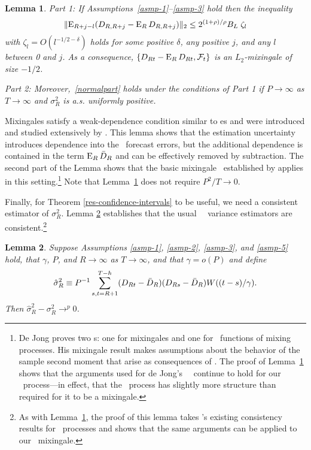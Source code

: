 \documentclass[11pt]{article}
\newtheorem{lem}{Lemma}
\newcommand{\citepos}[1]{\citeauthor{#1}'s \citeyearpar{#1}}
\begin{document}
\begin{lem}\label{res-mixingale}
  Part 1: If Assumptions~\ref{asmp-1}--\ref{asmp-3} hold then the
  inequality
  \begin{equation}\label{mixingaleR}
    \lVert \operatorname{E}_{R+j-l}(D_{R,R+j} - \operatorname{E}_R D_{R,R+j}) \rVert_2 \leq
    2^{(1+\rho)/\rho} B_L \;
    \zeta_l
  \end{equation}
  with $\zeta_l = O(l^{-1/2 - \delta})$ holds for some positive
  $\delta$, any positive $j$, and any $l$ between 0 and $j$.  As a
  consequence, $\{D_{Rt} - \operatorname{E}_R D_{Rt}, \mathcal F_t\}$ is an
  $L_2$-mixingale of size $-1/2$.  

  \noindent Part 2: Moreover,~\eqref{normalpart} holds under the
  conditions of Part 1 if $P \to \infty$ as $T \to \infty$ and
  $\sigma_R^2$ is a.s. uniformly positive.
\end{lem}

Mixingales satisfy a weak-dependence condition similar to \mds es and
were introduced and studied extensively by
\citet{Mcl:74,Mcl:75,Mcl:75b,Mcl:77}.  This lemma shows that the
estimation uncertainty introduces dependence into the \oos\ forecast
errors, but the additional dependence is contained in the term $\operatorname{E}_R
\bar{D}_{R}$ and can be effectively removed by subtraction.  The second part
of the Lemma shows that the basic mixingale \clt\ established by
\citet{Jon:97} applies in this setting.\footnote{De Jong proves two
  \clt s: one for mixingales and one for \ned\ functions of mixing
  processes.  His mixingale result makes assumptions about the
  behavior of the sample second moment that arise as consequences of
  \ned.  The proof of Lemma~\ref{res-mixingale} shows that the
  arguments used for de Jong's \ned\ \clt\ continue to hold for our
  \oos\ process---in effect, that the \oos\ process has slightly more
  structure than required for it to be a mixingale.}  Note that
Lemma~\ref{res-mixingale} does not require $P^2/T \to 0$.

Finally, for Theorem \ref{res-confidence-intervals} to be useful, we
need a consistent estimator of $\sigma_R^2$. Lemma
\ref{res-variance-estimator} establishes that the usual \oos\ \hac\
variance estimators are consistent.\footnote{As with
      Lemma~\ref{res-mixingale}, the proof of this lemma takes
      \citepos{JoD:00} existing consistency results
      for \ned\ processes and shows that the same arguments can be
      applied to our \oos\ mixingale.}

\begin{lem}
  \label{res-variance-estimator} Suppose Assumptions \ref{asmp-1},
  \ref{asmp-2}, \ref{asmp-3}, and \ref{asmp-5} hold, that $\gamma$,
  $P$, and $R \to \infty$ as $T \to \infty$, and that $\gamma = o(P)$
  and define
  \begin{equation*}
    \hat{\sigma}_R^2 \equiv P^{-1} \sum_{s,t=R+1}^{T-h} (D_{Rt} - \bar{D}_{R})(D_{Rs} - \bar{D}_{R})
    W((t-s)/\gamma).
  \end{equation*}
  Then $\hat{\sigma}_R^2 - \sigma_R^2 \to^p 0$.
\end{lem}
\end{document}
